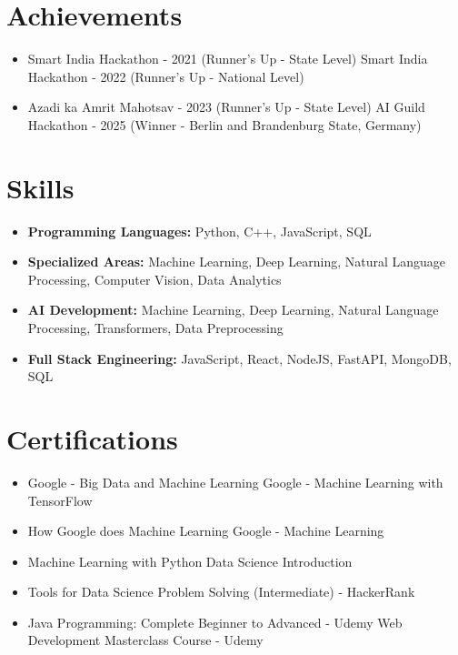\documentclass[a4paper,10pt]{article}
\begin{document}
\section*{Achievements}
\begin{itemize}
\item Smart India Hackathon - 2021 (Runner's Up - State Level) \hfill Smart India Hackathon - 2022 (Runner's Up - National Level)
\item Azadi ka Amrit Mahotsav - 2023 (Runner's Up - State Level) \hfill AI Guild Hackathon - 2025 (Winner - Berlin and Brandenburg State, Germany)
\end{itemize}

\section*{Skills}
\begin{itemize}
  \item \textbf{Programming Languages:} Python, C++, JavaScript, SQL
  \item \textbf{Specialized Areas:} Machine Learning, Deep Learning, Natural Language Processing, Computer Vision, Data Analytics
  \item \textbf{AI Development:} Machine Learning, Deep Learning, Natural Language Processing, Transformers, Data Preprocessing
  \item \textbf{Full Stack Engineering:} JavaScript, React, NodeJS, FastAPI, MongoDB, SQL
\end{itemize}

\section*{Certifications}
\begin{itemize}
\item Google - Big Data and Machine Learning \hfill Google - Machine Learning with TensorFlow
\item How Google does Machine Learning \hfill Google - Machine Learning
\item Machine Learning with Python \hfill Data Science Introduction
\item Tools for Data Science \hfill Problem Solving (Intermediate) - HackerRank
\item Java Programming: Complete Beginner to Advanced - Udemy \hfill Web Development Masterclass Course - Udemy
\end{itemize}
\end{document}
